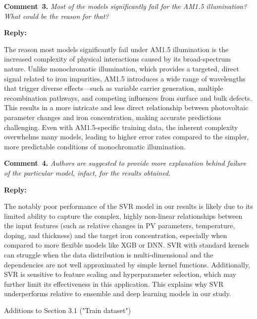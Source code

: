 \documentclass[a4paper,fleqn]{cas-sc}
\begin{document}
\vspace{1cm}
\noindent
\textcolor[rgb]{0.00,0.50,1.00}{\textbf{Comment~3.}}
\emph{Most of the models significantly fail for the AM1.5 illumination? What could be the reason for that?}

\noindent
\textcolor[rgb]{0.51,0.00,0.00}{\textbf{Reply:}}

The reason most models significantly fail under AM1.5 illumination is the increased complexity of physical interactions caused by its broad-spectrum nature. 
Unlike monochromatic illumination, which provides a targeted, direct signal related to iron impurities, AM1.5 introduces a wide range of wavelengths that trigger diverse effects—such as variable carrier generation, multiple recombination pathways, and competing influences from surface and bulk defects. 
This results in a more intricate and less direct relationship between photovoltaic parameter changes and iron concentration, making accurate predictions challenging. 
Even with AM1.5-specific training data, the inherent complexity overwhelms many models, leading to higher error rates compared to the simpler, more predictable conditions of monochromatic illumination.



\vspace{1cm}
\noindent
\textcolor[rgb]{0.00,0.50,1.00}{\textbf{Comment~4.}}
\emph{Authors are suggested to provide more explanation behind failure of the particular model, infact, for the results obtained.}

\noindent
\textcolor[rgb]{0.51,0.00,0.00}{\textbf{Reply:}}

The notably poor performance of the SVR model in our results is likely due to its limited ability to capture the complex, highly non-linear relationships between the input features (such as relative changes in PV parameters, temperature, doping, and thickness) and the target iron concentration, especially when compared to more flexible models like XGB or DNN. 
SVR with standard kernels can struggle when the data distribution is multi-dimensional and the dependencies are not well approximated by simple kernel functions. 
Additionally, SVR is sensitive to feature scaling and hyperparameter selection, which may further limit its effectiveness in this application. 
This explains why SVR underperforms relative to ensemble and deep learning models in our study.

Additions to Section 3.1 ("Train dataset")
\end{document}
